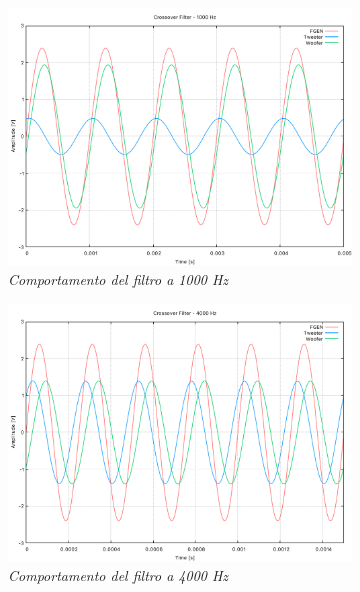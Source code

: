 \documentclass[12pt]{article}
\begin{document}
\begin{figure}[!ht]
  \begin{subfigure}{.5\textwidth}
    \centering
    \includegraphics[width=1\linewidth]{../results/CF1000Hz.pdf}
    \caption{\textit{Comportamento del filtro a 1000 Hz
    }}
  \end{subfigure}%
  \hfill
  \begin{subfigure}{.5\textwidth}
    \centering
    \includegraphics[width=1\linewidth]{../results/CF4000Hz.pdf}
    \caption{\textit{Comportamento del filtro a 4000 Hz}}
  \end{subfigure}
\color{white}{hdjdjfhjdhdjhfjdhfjdjfhjj}
  \begin{subfigure}{.5\textwidth}

\end{subfigure}
\end{figure}
\end{document}
